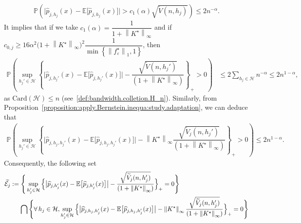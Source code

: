 \documentclass[11pt,a4paper,openany]{article}
\newcommand{\card}{\mbox{Card}}
\def\E{\mathbb{E}}
\begin{document}
	\begin{align*}
		\mathbb{P} \left( \big| \widehat{p}_{j, h_{j} }(x) - \E \big[ \widehat{p}_{j, h_{j} }(x) \big] \big|  >  c_{1}(\alpha)    \sqrt{\widetilde{V}(n  ,  h_{j})} \right)  \leq   2 n^{-\alpha} .
	\end{align*}
	It implies that if we take $c_{1}(\alpha) = \dfrac{1}{1 + \left\| K^{\star} \right\|_{\infty}}$ and if  $c_{0,j} \geq 16 \alpha^{2} \big( 1 + \left\| K^{\star} \right\|_{\infty}  \big)^{2} \dfrac{1}{ \min  \left\{     \left\| f_{\varepsilon}^{\star} \right\|_{1}      ,     1  \right\} } $, then
	\begin{align*}
		\mathbb{P} \left(  \sup_{h_{j}' \in \mathcal{H}}  \left\{ \big| \widehat{p}_{j,h_{j}'}(x)  -  \E \big[ \widehat{p}_{j,h_{j}'}(x) \big]  \big|  -   \dfrac{\sqrt{\widetilde{V}(n,h_{j}')}}{ (1 + \left\| K^{\star}  \right\|_{\infty} ) }  \right\}_{+}  >  0  \right)  &\leq  2   \sum_{h_{j} \in \mathcal{H}} n^{-  \alpha}  \leq   2  n^{1 - \alpha}  ,
	\end{align*}
	as $\card(\mathcal{H})  \leq  n$ (see~\eqref{def:bandwidth.colletion.H_n}).
	Similarly, from  Proposition~\ref{proposition:apply.Bernstein.inequa:study.adaptation}, we can deduce that  
	\begin{align*}
		\mathbb{P} \left( \sup_{h_{j}' \in \mathcal{H}}  \left\{\big| \widehat{p}_{j, h_{j} ,h_{j}'}(x) - \E \big[ \widehat{p}_{j, h_{j} ,h_{j}'}(x) \big] \big|  -   \left\| K ^{\star} \right\|_{\infty}    \dfrac{\sqrt{\widetilde{V}_{j}(n,h_{j}')}}{ (1 +  \left\| K ^{\star} \right\|_{\infty} ) }  \right\}_{+}   >   0   \right)  \leq   2 n^{1-\alpha} .
	\end{align*}
	Consequently, the following set
	\begin{align*}
		\widetilde {\mathcal {E}_j }
		&:=  \Bigg\{  \sup_{h_{j}' \in \mathcal{H}}  \Big\{ \big| \widehat{p}_{j,h_{j}'}(x)  -  \E \big[ \widehat{p}_{j,h_{j}'}(x) \big]  \big|  -    \dfrac{\sqrt{\widetilde{V}_{j}(n,h_{j}')}}{ (1 +  \left\| K^{\star} \right\|_{\infty} ) }  \Big\}_{+}  = 0  \Bigg\}
		\\
		&\hspace{0.5cm}  \bigcap  \Bigg\{ \forall \, h_j \in \mathcal{H},    \sup_{ h_{j}' \in \mathcal{H} }  \Big\{ \big| \widehat{p}_{j, h_{j} ,  h_{j}'}(x) - \E \big[ \widehat{p}_{j, h_{j} ,  h_{j}'}(x) \big] \big|    
		-   \left\| K^{\star} \right\|_{\infty}   \dfrac{\sqrt{\widetilde{V}_{j}(n,h_{j}')}}{ (1 + \left\| K^{\star} \right\|_{\infty} ) }  \Big\}_{+} = 0  \Bigg\}
	\end{align*}
\end{document}
